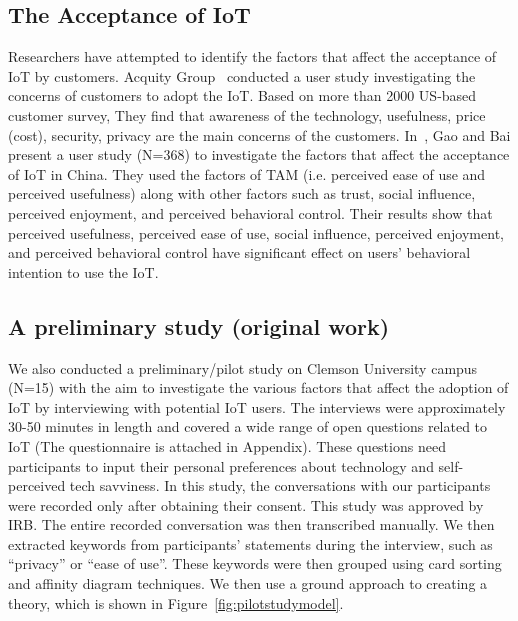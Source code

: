 \subsection{The Acceptance of IoT}
Researchers have attempted to identify the factors that affect the acceptance of IoT by customers. Acquity Group~\cite{acquity2014internet} conducted a user study investigating the concerns of customers to adopt the IoT. Based on more than 2000 US-based customer survey, They find that awareness of the technology, usefulness, price (cost), security, privacy are the main concerns of the customers. In~\cite{gao2014unified}, Gao and Bai present a user study (N=368) to investigate the factors that affect the acceptance of IoT in China. They used the factors of TAM (i.e. perceived ease of use and perceived usefulness) along with other factors such as trust, social influence, perceived enjoyment, and perceived behavioral control. Their results show that perceived usefulness, perceived ease of use, social influence, perceived enjoyment, and perceived behavioral control have significant effect on users' behavioral intention to use the IoT. 

\subsection{A preliminary study (original work)}
We also conducted a preliminary/pilot study on Clemson University campus (N=15) with the aim to investigate the various factors that affect the adoption of IoT by interviewing with potential IoT users. The interviews were approximately 30-50 minutes in length and covered a wide range of open questions related to IoT (The questionnaire is attached in Appendix). These questions need participants to input their personal preferences about technology and self-perceived tech savviness. In this study, the conversations with our participants were recorded only after obtaining their consent. This study was approved by IRB. The entire recorded conversation was then transcribed manually. We then extracted keywords from participants' statements during the interview, such as ``privacy'' or ``ease of use''. These keywords were then grouped using card sorting and affinity diagram techniques. We then use a ground approach to creating a theory, which is shown in Figure~\ref{fig:pilotstudymodel}.


